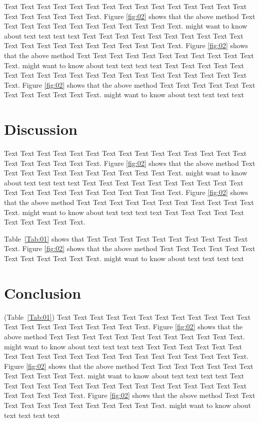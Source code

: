 \documentclass{Rpd}
\begin{document}
Text Text Text Text Text Text  Text Text Text Text Text Text Text Text Text  Text Text Text Text Text Text. Figure \ref{fig:02} shows that the above method  Text Text Text Text  Text Text Text Text Text Text  Text Text.  \cite{Boffelli03} might want to know about  text text text text
Text Text Text Text Text Text  Text Text Text Text Text Text Text Text Text  Text Text Text Text Text Text. Figure \ref{fig:02} shows that the above method  Text Text Text Text  Text Text Text Text Text Text  Text Text.  \cite{Boffelli03} might want to know about  text text text text
Text Text Text Text Text Text  Text Text Text Text Text Text Text Text Text  Text Text Text Text Text Text. Figure \ref{fig:02} shows that the above method  Text Text Text Text  Text Text Text Text Text Text  Text Text.  \cite{Boffelli03} might want to know about  text text text text


\section{Discussion}

Text Text Text Text Text Text  Text Text Text Text Text Text Text Text Text  Text Text Text Text Text Text. Figure \ref{fig:02} shows that the above method  Text Text Text Text  Text Text Text Text Text Text  Text Text.  \cite{Boffelli03} might want to know about  text text text text
Text Text Text Text Text Text  Text Text Text Text Text Text Text Text Text  Text Text Text Text Text Text. Figure \ref{fig:02} shows that the above method  Text Text Text Text  Text Text Text Text Text Text  Text Text.  \cite{Boffelli03} might want to know about  text text text text
Text Text Text Text Text Text  Text Text Text Text.

Table~\ref{Tab:01} shows that Text Text Text Text Text  Text Text Text Text Text Text. Figure \ref{fig:02} shows that the above method  Text Text Text Text  Text Text Text Text Text Text  Text Text.  \cite{Boffelli03} might want to know about  text text text text


\section{Conclusion}

(Table~\ref{Tab:01}) Text Text Text Text Text Text  Text Text Text Text Text Text Text Text Text  Text Text Text Text Text Text. Figure \ref{fig:02} shows that the above method  Text Text Text Text  Text Text Text Text Text Text  Text Text.  \cite{Boffelli03} might want to know about  text text text text
Text Text Text Text Text Text  Text Text Text Text Text Text Text Text Text  Text Text Text Text Text Text. Figure \ref{fig:02} shows that the above method  Text Text Text Text  Text Text Text Text Text Text  Text Text.  \cite{Boffelli03} might want to know about  text text text text
Text Text Text Text Text Text  Text Text Text Text Text Text Text Text Text  Text Text Text Text Text Text. Figure \ref{fig:02} shows that the above method  Text Text Text Text  Text Text Text Text Text Text  Text Text.  \cite{Boffelli03} might want to know about  text text text text
\end{document}
